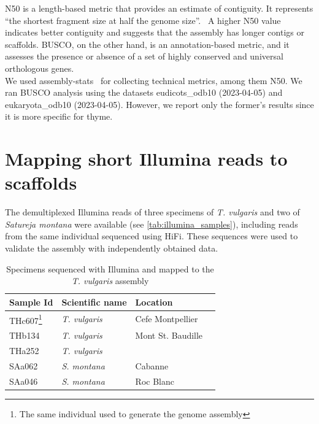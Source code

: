 N50 is a length-based metric that provides an estimate of contiguity. It represents \enquote{the shortest fragment size at half the genome size}.~\cite{mokhtarLargescaleAssessmentQuality2023} A higher N50 value indicates better contiguity and suggests that the assembly has longer contigs or scaffolds. BUSCO, on the other hand, is an annotation-based metric, and it assesses the presence or absence of a set of highly conserved and universal orthologous genes. \\

We used assembly-stats~\cite{SangerpathogensAssemblystatsGet} for collecting technical metrics, among them N50. We ran BUSCO analysis using the datasets eudicots\_odb10 (2023-04-05) and eukaryota\_odb10 (2023-04-05). However, we report only the former's results since it is more specific for thyme.\\



\section*{Mapping short Illumina reads to scaffolds}\label{sec:illumina}

The demultiplexed Illumina reads of three specimens of \textit{T. vulgaris} and two of \textit{Satureja montana} were available (see \autoref{tab:illumina_samples}), including reads from the same individual sequenced using \ac{HiFi}. These sequences were used to validate the assembly with independently obtained data. \\

\begin{table}[h]
    \begin{minipage}{\linewidth}
    \renewcommand\thefootnote{\thempfootnote}
    \centering
    \begin{tabular}{@{}llll@{}}
    \toprule
    Sample Id & Scientific name & Location     \\ \midrule
    THc607\footnote{The same individual used to generate the genome assembly}    & \textit{T. vulgaris}   &  Cefe Montpellier  \\
    THb134    & \textit{T. vulgaris} & Mont St. Baudille   \\
    THa252    & \textit{T. vulgaris}& \\
    SAa062    & \textit{S. montana} & Cabanne     \\
    SAa046    & \textit{S. montana}  & Roc Blanc    \\ \bottomrule
    \end{tabular}
    \caption{Specimens sequenced with Illumina and mapped to the \textit{T. vulgaris} assembly}
    \label{tab:illumina_samples}
    \end{minipage}
    \end{table}

